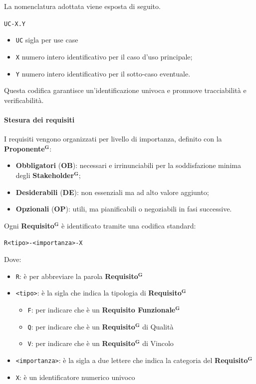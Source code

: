 \documentclass[a4paper,12pt]{article}
\newcommand{\term}[1]{\textbf{#1}$^\mathbf{G}$}
\begin{document}
La nomenclatura adottata viene esposta di seguito.
\begin{center}
    \texttt{UC-X.Y}
\end{center}
\begin{itemize}
    \item \texttt{UC} sigla per use case
    \item \texttt{X} numero intero identificativo per il caso d'uso principale;
    \item \texttt{Y} numero intero identificativo per il sotto-caso eventuale.
\end{itemize}
Questa codifica garantisce un’identificazione univoca e promuove tracciabilità e verificabilità.

\paragraph{Stesura dei requisiti}
I requisiti vengono organizzati per livello di importanza, definito con la \term{Proponente}:
\begin{itemize}
    \item \textbf{Obbligatori} (\textbf{OB}): necessari e irrinunciabili per la soddisfazione minima degli \term{Stakeholder};
    \item \textbf{Desiderabili} (\textbf{DE}): non essenziali ma ad alto valore aggiunto;
    \item \textbf{Opzionali} (\textbf{OP}): utili, ma pianificabili o negoziabili in fasi successive.
\end{itemize}

Ogni \term{Requisito} è identificato tramite una codifica standard:
\begin{center}
    \texttt{R<tipo>-<importanza>-X}
\end{center}
Dove:
\begin{itemize}
    \item \texttt{R}: è per abbreviare la parola \term{Requisito}
    \item \texttt{<tipo>}: è la sigla che indica la tipologia di \term{Requisito}
    \begin{itemize}
        \item \texttt{F}: per indicare che è un \term{Requisito Funzionale}
        \item \texttt{Q}: per indicare che è un \term{Requisito} di Qualità
        \item \texttt{V}: per indicare che è un \term{Requisito} di Vincolo
    \end{itemize}
    \item \texttt{<importanza>}: è la sigla a due lettere che indica la categoria del \term{Requisito}
    \item \texttt{X}: è un identificatore numerico univoco
\end{itemize}
\end{document}
